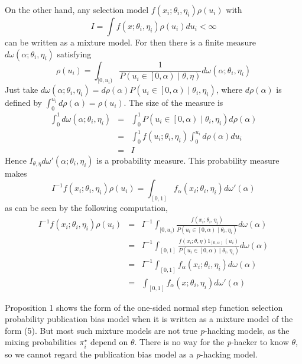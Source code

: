 On the other hand, any selection model $f(x_{i};\theta_{i},\eta_{i})\rho(u_i)$ with $$I =\int f(x;\theta_{i},\eta_{i})\rho(u_i)du_i<\infty$$ can be written as a mixture model. For then there is a finite measure $d\omega(\alpha;\theta_{i},\eta_{i})$ satisfying 
\[
\rho(u_i)=\int_{[0,u_i)}\frac{1}{P(u_i\in\left[0,\alpha\right)\mid\theta,\eta)}d\omega(\alpha;\theta_{i},\eta_{i})
\]
Just take $d\omega(\alpha;\theta_{i},\eta_{i})=d\rho(\alpha)P(u_i\in\left[0,\alpha\right)\mid\theta_{i},\eta_{i})$, where $d\rho(\alpha)$ is defined by $\int_{0}^{u_i}d\rho(\alpha)=\rho(u_i)$. The size of the measure is
\begin{eqnarray*}
\int_{0}^{1}d\omega(\alpha;\theta_{i},\eta_{i}) & = & \int_{0}^{1}P(u_i\in\left[0,\alpha\right)\mid\theta_{i},\eta_{i})d\rho(\alpha)\\
 & = & \int_{0}^{1}f(u_i;\theta_{i},\eta_{i})\int_{0}^{u_i}d\rho(\alpha)du_i\\
 & = & I
\end{eqnarray*}
Hence $I_{\theta,\eta}d\omega'(\alpha;\theta_{i},\eta_{i})$ is a probability measure. This probability measure makes 
\[
I^{-1}f(x_{i};\theta_{i},\eta_{i})\rho(u_i)=\int_{[0,1]}f_\alpha(x_{i};\theta_{i},\eta_{i})d\omega'(\alpha)
\]
as can be seen by the following computation,
\begin{eqnarray*}
I^{-1}f(x_{i};\theta_{i},\eta_{i})\rho(u_i) & = & I^{-1}\int_{[0,u_i)}\frac{f(x_{i};\theta_{i},\eta_{i})}{P(u_i\in\left[0,\alpha\right)\mid\theta_{i},\eta_{i})}d\omega(\alpha)\\
 & = & I^{-1}\int_{[0,1]}\frac{f(x_{i};\theta,\eta)1_{\left[0,\alpha\right)}(u_i)}{P(u_i\in\left[0,\alpha\right)\mid\theta_{i},\eta_{i})}d\omega(\alpha)\\
 & = & I^{-1}\int_{[0,1]}f_\alpha(x_{i};\theta_{i},\eta_{i})d\omega(\alpha)\\
 & = & \int_{[0,1]}f_\alpha(x;\theta_{i},\eta_{i})d\omega'(\alpha)
\end{eqnarray*}

Proposition 1 shows the form of the one-sided normal step function selection probability publication bias model when it is written as a mixture model of the form (5). But most such mixture models are not true \textit{p}-hacking models, as the mixing probabilities $\pi_{i}^{\star}$ depend on $\theta$. There is no way for the \textit{p}-hacker to know $\theta$, so we cannot regard the publication bias model as a \textit{p}-hacking model.